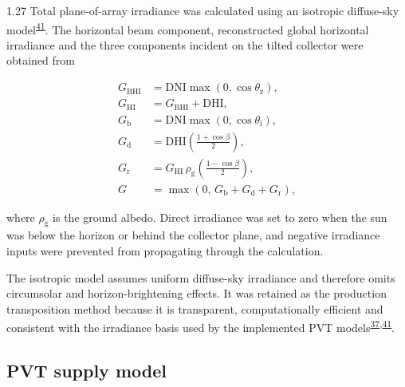 \documentclass[12pt,letterpaper]{article}
\newcommand{\done}{\ \textcolor{green!45!black}{$\checkmark$}} %
\DeclareRobustCommand{\citenum}[1]{\hyperlink{ref:#1}{#1}} %
\begin{document}
\begin{spacing}{1.27}
Total plane-of-array irradiance was calculated using an isotropic diffuse-sky model\textsuperscript{\citenum{41}}. The horizontal beam component, reconstructed global horizontal irradiance and the three components incident on the tilted collector were obtained from

\begin{align}
G_{\mathrm{BHI}} &= \mathrm{DNI}\max\left(0,\cos\theta_{\mathrm{z}}\right), \label{eq:gbhi}\\
G_{\mathrm{HI}} &= G_{\mathrm{BHI}}+\mathrm{DHI}, \label{eq:ghi}\\
G_{\mathrm{b}} &= \mathrm{DNI}\max\left(0,\cos\theta_{\mathrm{i}}\right), \label{eq:gb}\\
G_{\mathrm{d}} &= \mathrm{DHI}\left(\frac{1+\cos\beta}{2}\right), \label{eq:gd}\\
G_{\mathrm{r}} &= G_{\mathrm{HI}}\,\rho_{\mathrm{g}}\left(\frac{1-\cos\beta}{2}\right), \label{eq:gr}\\
G &= \max\left(0,\, G_{\mathrm{b}}+G_{\mathrm{d}}+G_{\mathrm{r}}\right), \label{eq:gtotal}
\end{align}

\noindent where $\rho_{\mathrm{g}}$ is the ground albedo. Direct irradiance was set to zero when the sun was below the horizon or behind the collector plane, and negative irradiance inputs were prevented from propagating through the calculation.\par

\vspace{0.15in}

The isotropic model assumes uniform diffuse-sky irradiance and therefore omits circumsolar and horizon-brightening effects. It was retained as the production transposition method because it is transparent, computationally efficient and consistent with the irradiance basis used by the implemented PVT models\textsuperscript{\citenum{37},\citenum{41}}.\par
\end{spacing}

\subsection[PVT supply model\done]{PVT supply model}\label{sec22}
\end{document}
